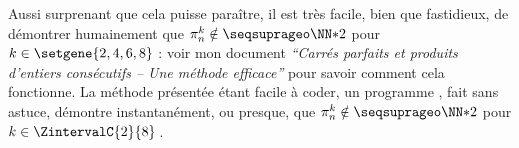 \leavevmode
\smallskip

Aussi surprenant que cela puisse paraître, il est très facile, bien que fastidieux, de démontrer humainement que $\consprod \notin \NNssquare$ pour $k \in \setgene{2, 4, 6, 8}$ :
voir mon document \emph{\enquote{Carrés parfaits et produits d’entiers consécutifs – Une méthode efficace}} pour savoir comment cela fonctionne.
La méthode présentée étant facile à coder, un programme \python, fait sans astuce, démontre instantanément, ou presque, que $\consprod \notin \NNssquare$ pour $k \in \ZintervalC{2}{8}$\,.